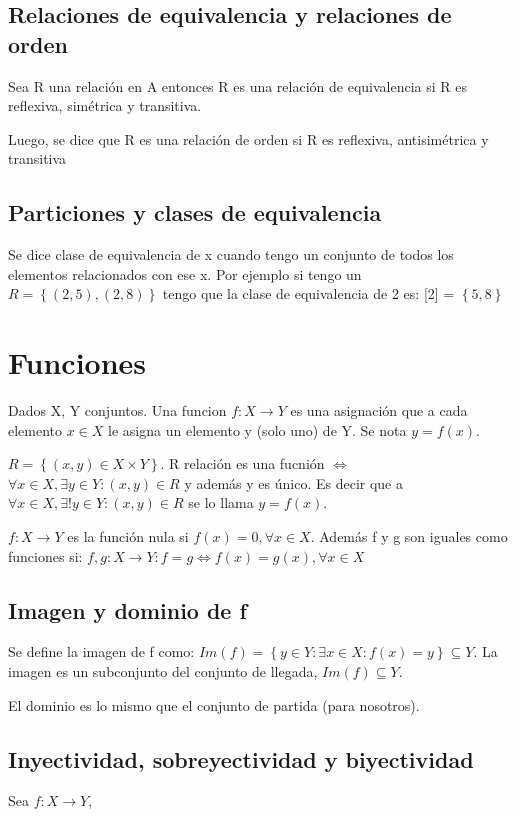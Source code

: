 \documentclass{report}
\begin{document}
\subsection{Relaciones de equivalencia y relaciones de orden}
Sea R una relación en A entonces R es una relación de equivalencia si R es reflexiva, simétrica y transitiva.

Luego, se dice que R es una relación de orden si R es reflexiva, antisimétrica y transitiva

\subsection{Particiones y clases de equivalencia}
Se dice clase de equivalencia de x cuando tengo un conjunto de todos los elementos relacionados con ese x. Por ejemplo si tengo un $R=\left\{(2,5),(2,8)\right\}$ tengo que la clase de equivalencia de 2 es: [2] = $\left\{5,8\right\}$

\section{Funciones}
Dados X, Y conjuntos. Una funcion $f:X \rightarrow Y$ es una asignación que a cada elemento $x \in X$ le asigna un elemento y (solo uno) de Y. Se nota $y=f(x)$.

$R = \left\{(x,y) \in X \times Y\right\}$. R relación es una fucnión $\iff$ $\forall x \in X, \exists y \in Y: (x,y)\in R$ y además y es único. Es decir que a $\forall x \in X, \exists! y \in Y: (x,y) \in R$ se lo llama $y=f(x)$.

$f:X \rightarrow Y$ es la función nula si $f(x)=0, \forall x \in X$. Además f y g son iguales como funciones si: $f,g:X \rightarrow Y: f=g \iff f(x) = g(x), \forall x\in X$

\subsection{Imagen y dominio de f}
Se define la imagen de f como: $Im(f) = \left\{y\in Y: \exists x \in X: f(x) = y\right\} \subseteq Y$. La imagen es un subconjunto del conjunto de llegada, $Im(f) \subseteq Y$.

El dominio es lo mismo que el conjunto de partida (para nosotros).

\subsection{Inyectividad, sobreyectividad y biyectividad}
Sea $f:X \rightarrow Y$,
\end{document}
